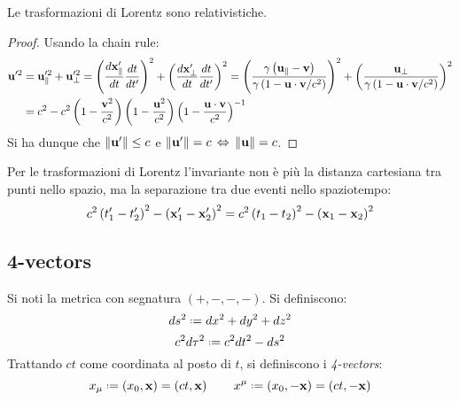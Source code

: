 \begin{proposition}
	Le trasformazioni di Lorentz sono relativistiche.
\end{proposition}
\begin{proof}
	Usando la chain rule:
	\begin{equation*}
		\begin{split}
			\mathbf{u}'^2
			&= \mathbf{u}'^2_{\parallel} + \mathbf{u}'^2_{\perp} = \left( \frac{d\mathbf{x}'_{\parallel}}{dt} \frac{dt}{dt'} \right)^2 + \left( \frac{d\mathbf{x}'_{\perp}}{dt} \frac{dt}{dt'} \right)^2 = \left( \frac{\gamma \left( \mathbf{u}_{\parallel} - \mathbf{v} \right)}{\gamma \left( 1 - \mathbf{u} \cdot \mathbf{v} / c^2 \right)} \right)^2 + \left( \frac{\mathbf{u}_{\perp}}{\gamma \left( 1 - \mathbf{u} \cdot \mathbf{v} / c^2 \right)} \right)^2 \\
			&= c^2 - c^2 \left( 1 - \frac{\mathbf{v}^2}{c^2} \right) \left( 1 - \frac{\mathbf{u}^2}{c^2} \right) \left( 1 - \frac{\mathbf{u} \cdot \mathbf{v}}{c^2} \right)^{-1}
		\end{split}
	\end{equation*}
	Si ha dunque che $ \left\lVert\mathbf{u}'\right\rVert \le c $ e $ \left\lVert\mathbf{u}'\right\rVert = c \,\Leftrightarrow\, \left\lVert\mathbf{u}\right\rVert = c $.
\end{proof}

Per le trasformazioni di Lorentz l'invariante non è più la distanza cartesiana tra punti nello spazio, ma la separazione tra due eventi nello spaziotempo:
\begin{equation}
	c^2 \left( t'_1 - t'_2 \right)^2 - \left( \mathbf{x}'_1 - \mathbf{x}'_2 \right)^2 = c^2 \left( t_1 - t_2 \right)^2 - \left( \mathbf{x}_1 - \mathbf{x}_2 \right)^2
	\label{eq:10.5}
\end{equation}

\subsection{4-vectors}

Si noti la metrica con segnatura $ \left( +,-,-,- \right) $. Si definiscono:
\begin{equation}
	ds^2 \defeq dx^2 + dy^2 + dz^2
	\label{eq:10.6}
\end{equation}
\begin{equation}
	c^2 d\tau^2 \defeq c^2 dt^2 - ds^2
	\label{eq:10.7}
\end{equation}
Trattando $ ct $ come coordinata al posto di $ t $, si definiscono i \textit{4-vectors}:
\begin{equation}
	x_{\mu} \defeq \left( x_0, \ve{x} \right) = \left( ct, \ve{x} \right)
	\qquad
	x^{\mu} \defeq \left( x_0, -\ve{x} \right) = \left( ct, -\ve{x} \right)
	\label{eq:10.8}
\end{equation}

